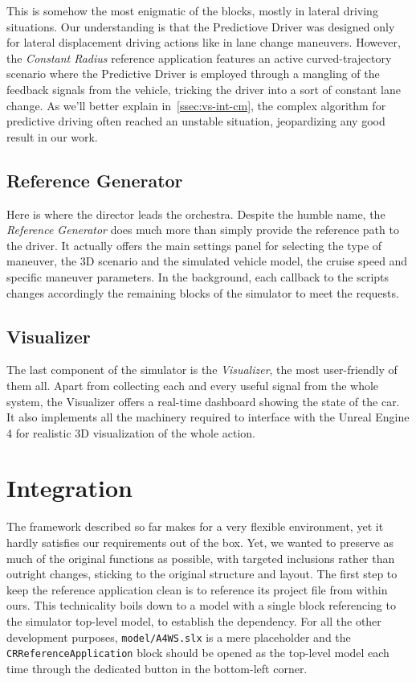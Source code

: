 		This is somehow the most enigmatic of the blocks, mostly in lateral driving situations. Our understanding is that the Predictiove Driver was designed only for
		lateral displacement driving actions like in lane change maneuvers. However, the \emph{Constant Radius} reference application features an active curved-trajectory
		scenario where the Predictive Driver is employed through a mangling of the feedback signals from the vehicle, tricking the driver into a sort of constant lane change. As
		we'll better explain in~\vref{ssec:vs-int-cm}, the complex algorithm for predictive driving often reached an unstable situation, jeopardizing any good result in our work.


		\subsection{Reference Generator}

		Here is where the director leads the orchestra. Despite the humble name, the \emph{Reference Generator} does much more than simply provide the reference path
		to the driver. It actually offers the main settings panel for selecting the type of maneuver, the 3D scenario and the simulated vehicle model, the cruise speed and specific
		maneuver parameters. In the background, each callback to the scripts changes accordingly the remaining blocks of the simulator to meet the requests.


		\subsection{Visualizer}

		The last component of the simulator is the \emph{Visualizer}, the most user-friendly of them all. Apart from collecting each and every useful signal from the whole system,
		the Visualizer offers a real-time dashboard showing the state of the car. It also implements all the machinery required to interface with the Unreal Engine 4 for realistic
		3D visualization of the whole action.


	\section{Integration}
	
	The framework described so far makes for a very flexible environment, yet it hardly satisfies our requirements out of the box.
	Yet, we wanted to preserve as much of the original functions as possible, with targeted inclusions rather than outright changes, sticking to the original structure and layout.
	The first step to keep the reference application clean is to reference its project file from within ours. This technicality boils down to a \mwSL{} model with a single block
	referencing to the simulator top-level model, to establish the dependency. For all the other development purposes, \texttt{model/A4WS.slx} is a mere placeholder and the
	\lstinline{CRReferenceApplication} block should be opened as the top-level model each time through the dedicated button in the bottom-left corner.


